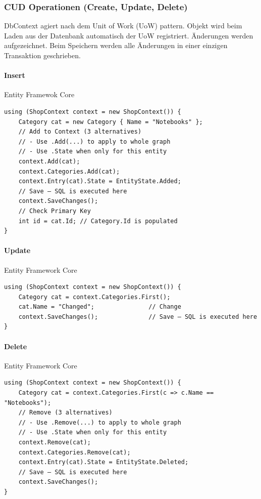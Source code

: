\documentclass[
a4paper,
oneside,
10pt,
fleqn,
headsepline,
toc=listofnumbered, 
bibliography=totocnumbered]{scrartcl}
\begin{document}
\subsubsection{CUD Operationen (Create, Update, Delete)}
DbContext agiert nach dem Unit of Work (UoW) pattern. Objekt wird beim Laden aus der Datenbank automatisch der UoW registriert. Änderungen werden aufgezeichnet. Beim Speichern werden alle Änderungen in einer einzigen Transaktion geschrieben.
\paragraph{Insert} Entity Framewok Core
\begin{lstlisting}
using (ShopContext context = new ShopContext()) {
    Category cat = new Category { Name = "Notebooks" };
    // Add to Context (3 alternatives)
    // - Use .Add(...) to apply to whole graph
    // - Use .State when only for this entity
    context.Add(cat);
    context.Categories.Add(cat);
    context.Entry(cat).State = EntityState.Added;
    // Save – SQL is executed here
    context.SaveChanges();
    // Check Primary Key
    int id = cat.Id; // Category.Id is populated
}
\end{lstlisting}

\paragraph{Update} Entity Framework Core
\begin{lstlisting}
using (ShopContext context = new ShopContext()) {
    Category cat = context.Categories.First();
    cat.Name = "Changed";               // Change
    context.SaveChanges();              // Save – SQL is executed here
}
\end{lstlisting}

\paragraph{Delete} Entity Framework Core
\begin{lstlisting}
using (ShopContext context = new ShopContext()) {
    Category cat = context.Categories.First(c => c.Name == "Notebooks");
    // Remove (3 alternatives)
    // - Use .Remove(...) to apply to whole graph
    // - Use .State when only for this entity
    context.Remove(cat);
    context.Categories.Remove(cat);
    context.Entry(cat).State = EntityState.Deleted;
    // Save – SQL is executed here
    context.SaveChanges();              
}
\end{lstlisting}
\end{document}
